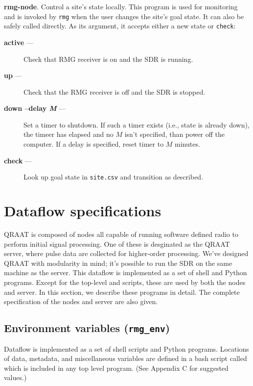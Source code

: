 \documentclass[letter]{article}
\begin{document}
\textbf{rmg-node}. Control a site's state locally. This program is used for monitoring 
and is invoked by \texttt{rmg} when the user changes the site's goal state. It can also be safely
called directly. As its argument, it accepts either a new state or \texttt{check}: 
\begin{description}
  \item[\quad \textbf{active} ---] Check that RMG receiver is on and the SDR is running. 
  \item[\quad \textbf{up} ---] Check that the RMG receiver is off and the SDR is stopped. 
  \item[\quad \textbf{down --delay \textit{M}} ---] Set a timer to shutdown. If such a timer 
    exists (i.e., state is already down), the timeer has elapsed and no $M$ isn't specified, than 
    power off the computer. If a delay is specified, reset timer to $M$ minutes. 
  \item[\quad \textbf{check} ---] Look up goal state in \texttt{site.csv} and transition
    as described. 
\end{description}


\section{Dataflow specifications}
QRAAT is composed of nodes all capable of running software defined radio to perform
initial signal processing. One of these is desginated as the QRAAT server, where 
pulse data are collected for higher-order processing. We've designed QRAAT with 
modularity in mind; it's possible to run the SDR on the same machine as the server. 
This dataflow is implemented as a set of shell and Python programs. Except
for the top-level  and  scripts, these are used by 
both the nodes and server. In this section, we describe these programs in detail. 
The complete specification of the nodes and server are also given. 



\subsection{Environment variables (\texttt{rmg\_env})}
Dataflow is implemented as a set of shell scripts and Python programs. Locations of
data, metadata, and miscellaneous variables are defined in a bash script called 
 which is included in any top level program. (See Appendix C for 
suggested values.) 
\end{document}
